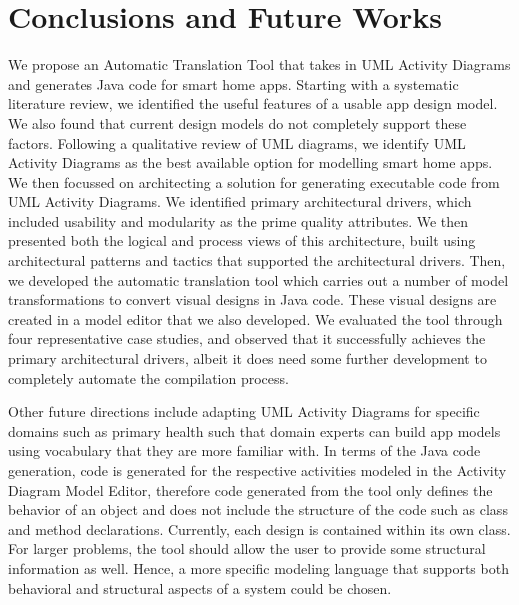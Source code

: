 \section{Conclusions and Future Works}

We propose an Automatic Translation Tool that takes in UML Activity Diagrams and generates Java code for smart home apps. Starting with a systematic literature review, we identified the useful features of a usable app design model. We also found that current design models do not completely support these factors. Following a qualitative review of UML diagrams, we identify UML Activity Diagrams as the best available option for modelling smart home apps. We then focussed on architecting a solution for generating executable code from UML Activity Diagrams. We identified primary architectural drivers, which included usability and modularity as the prime quality attributes. We then presented both the logical and process views of this architecture, built using architectural patterns and tactics that supported the architectural drivers. Then, we developed the automatic translation tool which carries out a number of model transformations to convert visual designs in Java code. These visual designs are created in a model editor that we also developed. We evaluated the tool through four representative case studies, and observed that it successfully achieves the primary architectural drivers, albeit it does need some further development to completely automate the compilation process. 

Other future directions include adapting UML Activity Diagrams for specific domains such as primary health such that domain experts can build app models using vocabulary that they are more familiar with. 
In terms of the Java code generation, code is generated for the respective activities modeled in the Activity Diagram Model Editor, therefore code generated from the tool only defines the behavior of an object and does not include the structure of the code such as class and method declarations. Currently, each design is contained within its own class. For larger problems, the tool should allow the user to provide some structural information as well. 
Hence, a more specific modeling language  that supports both behavioral and structural aspects of a system could be chosen. 
